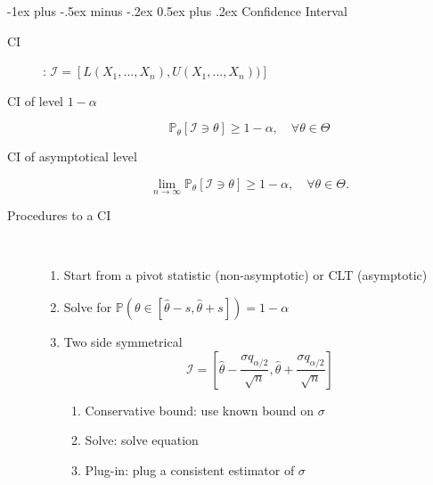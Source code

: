 \documentclass[a4paper, 10pt,landscape]{article}
\makeatletter
\renewcommand{\section}{\@startsection{section}{1}{0mm}%
                                {-1ex plus -.5ex minus -.2ex}%
                                {0.5ex plus .2ex}%
                                {\normalfont\large\bfseries}}
\makeatother
\begin{document}
\begin{multicols*}{3}
\section{Confidence Interval}
	\begin{description}
		\item[CI]: $\mathcal{I} = [L(X_1,...,X_n), U(X_1,...,X_n))]$
		\item[CI of level $1-\alpha$] $$\mathbb{P}_\theta\left[\mathcal{I}\ni\theta\right]\geq1-\alpha,\quad\forall\theta\in\Theta$$
		\item[CI of asymptotical level]  $$\lim\limits_{n\rightarrow\infty}\mathbb{P}_\theta\left[\mathcal{I}\ni\theta\right]\geq1-\alpha,\quad\forall\theta\in\Theta.$$
		\item[Procedures to a CI] ~
			\begin{enumerate}
				\item  Start from a pivot statistic (non-asymptotic) or CLT (asymptotic)
				\item Solve for $\mathbb{P}(\theta \in [\widehat{\theta}-s, \widehat{\theta}+s]) = 1-\alpha$
				\item  Two side symmetrical $$\mathcal{I} = [\widehat{\theta} - \dfrac{\sigma q_{\alpha / 2}}{\sqrt{n}}, \widehat{\theta} + \dfrac{\sigma q_{\alpha / 2}}{\sqrt{n}}]$$
					\begin{enumerate}
						\item Conservative bound: use known bound on $\sigma$
						\item Solve: solve equation
						\item Plug-in: plug a consistent estimator of $\sigma$ 
					\end{enumerate}
			\end{enumerate}
	\end{description}


\end{multicols*}
\end{document}
